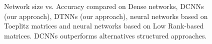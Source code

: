 


%        
%        


\begin{figure}
   \centering
   
   \caption{Network size vs. Accuracy compared on Dense networks, DCNNs (our approach), DTNNs (our approach), neural networks based on Toeplitz matrices and neural networks based on Low Rank-based matrices. DCNNs outperforms alternatives structured approaches.}
   \label{figure:cifar10_type}
\end{figure}

